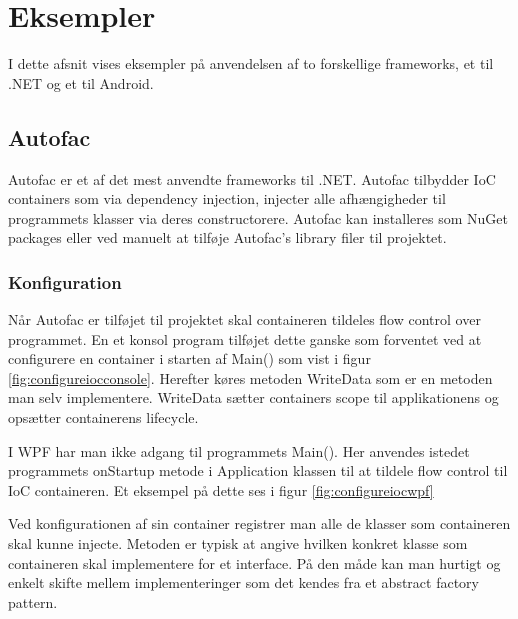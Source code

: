 \thispagestyle{fancy}
\chapter{Eksempler}
\label{chp:examples}
I dette afsnit vises eksempler på anvendelsen af to forskellige frameworks, et til .NET og et til Android. 
\section{Autofac}
Autofac er et af det mest anvendte frameworks til .NET. Autofac tilbydder IoC containers som via dependency injection, injecter alle afhængigheder til programmets klasser via deres constructorere. Autofac kan installeres som NuGet packages eller ved manuelt at tilføje Autofac's library filer til projektet.


\subsection{Konfiguration}
Når Autofac er tilføjet til projektet skal containeren tildeles flow control over programmet. En et konsol program tilføjet dette ganske som forventet ved at configurere en container i starten af Main() som vist i figur \ref{fig:configureiocconsole}. Herefter køres metoden WriteData som er en metoden man selv implementere. WriteData sætter containers scope til applikationens og opsætter containerens lifecycle.

\FloatBarrier

I WPF har man ikke adgang til programmets Main(). Her anvendes istedet programmets onStartup metode i Application klassen til at tildele flow control til IoC containeren. Et eksempel på dette ses i figur \ref{fig:configureiocwpf}


Ved konfigurationen af sin container registrer man alle de klasser som containeren skal kunne injecte. Metoden er typisk at angive hvilken konkret klasse som containeren skal implementere for et interface. På den måde kan man hurtigt og enkelt skifte mellem implementeringer som det kendes fra et abstract factory pattern.

